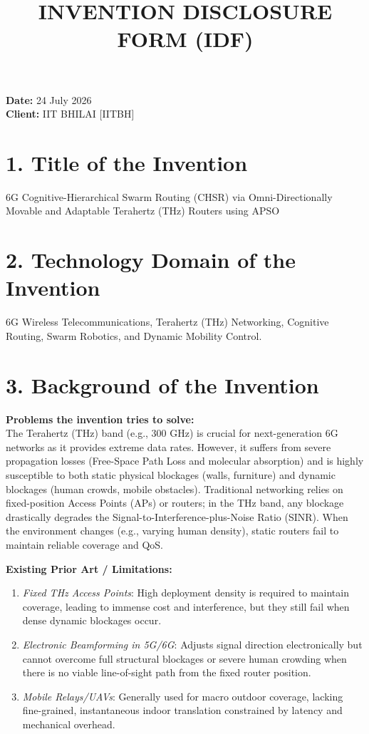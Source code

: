 \documentclass[11pt, a4paper]{article}
\title{\textbf{INVENTION DISCLOSURE FORM (IDF)}}
\author{}
\date{}
\begin{document}
\maketitle

\noindent\textbf{Date:} 24 July 2026 \\
\textbf{Client:} IIT BHILAI [IITBH] \\

\section*{1. Title of the Invention}
6G Cognitive-Hierarchical Swarm Routing (CHSR) via Omni-Directionally Movable and Adaptable Terahertz (THz) Routers using APSO

\section*{2. Technology Domain of the Invention}
6G Wireless Telecommunications, Terahertz (THz) Networking, Cognitive Routing, Swarm Robotics, and Dynamic Mobility Control.

\section*{3. Background of the Invention}
\textbf{Problems the invention tries to solve:} \\
The Terahertz (THz) band (e.g., 300 GHz) is crucial for next-generation 6G networks as it provides extreme data rates. However, it suffers from severe propagation losses (Free-Space Path Loss and molecular absorption) and is highly susceptible to both static physical blockages (walls, furniture) and dynamic blockages (human crowds, mobile obstacles). Traditional networking relies on fixed-position Access Points (APs) or routers; in the THz band, any blockage drastically degrades the Signal-to-Interference-plus-Noise Ratio (SINR). When the environment changes (e.g., varying human density), static routers fail to maintain reliable coverage and QoS. 

\vspace{0.5cm}
\noindent\textbf{Existing Prior Art / Limitations:}
\begin{enumerate}
    \item \textit{Fixed THz Access Points}: High deployment density is required to maintain coverage, leading to immense cost and interference, but they still fail when dense dynamic blockages occur.
    \item \textit{Electronic Beamforming in 5G/6G}: Adjusts signal direction electronically but cannot overcome full structural blockages or severe human crowding when there is no viable line-of-sight path from the fixed router position.
    \item \textit{Mobile Relays/UAVs}: Generally used for macro outdoor coverage, lacking fine-grained, instantaneous indoor translation constrained by latency and mechanical overhead.
\end{enumerate}
\end{document}
